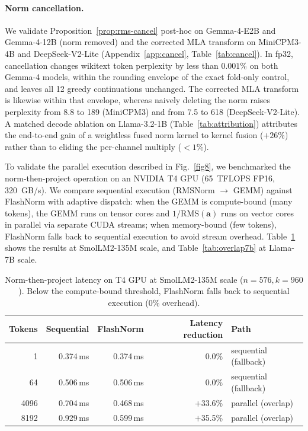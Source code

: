 \documentclass{article}
\begin{document}
\paragraph{Norm cancellation.} We validate Proposition~\ref{prop:rms-cancel} post-hoc on Gemma-4-E2B and Gemma-4-12B (norm removed) and the corrected MLA transform on MiniCPM3-4B and DeepSeek-V2-Lite (Appendix~\ref{app:cancel}, Table~\ref{tab:cancel}). In fp32, cancellation changes wikitext token perplexity by less than $0.001\%$ on both Gemma-4 models, within the rounding envelope of the exact fold-only control, and leaves all 12 greedy continuations unchanged. The corrected MLA transform is likewise within that envelope, whereas naively deleting the norm raises perplexity from 8.8 to 189 (MiniCPM3) and from 7.5 to 618 (DeepSeek-V2-Lite). A matched decode ablation on Llama-3.2-1B (Table~\ref{tab:attribution}) attributes the end-to-end gain of a weightless fused norm kernel to kernel fusion ($+26\%$) rather than to eliding the per-channel multiply ($<1\%$).

To validate the parallel execution described in Fig.~\ref{fig8}, we benchmarked the norm-then-project operation on an NVIDIA T4 GPU (65~TFLOPS FP16, 320~GB/s). We compare sequential execution (RMSNorm $\rightarrow$ GEMM) against FlashNorm with adaptive dispatch: when the GEMM is compute-bound (many tokens), the GEMM runs on tensor cores and $1/\mathrm{RMS}(\mathbf{a})$ runs on vector cores in parallel via separate CUDA streams; when memory-bound (few tokens), FlashNorm falls back to sequential execution to avoid stream overhead. Table~\ref{tab:overlap} shows the results at SmolLM2-135M scale, and Table~\ref{tab:overlap7b} at Llama-7B scale.

\begin{table}[h!] \centering
\caption{Norm-then-project latency on T4 GPU at SmolLM2-135M scale ($n{=}576, k{=}960$). Below the compute-bound threshold, FlashNorm falls back to sequential execution (0\% overhead).}
\label{tab:overlap}
\begin{tabular}{r r r r l}
\hline
Tokens & Sequential & FlashNorm & Latency reduction & Path \\
\hline
1      & 0.374\,ms & 0.374\,ms & $0.0$\% & sequential (fallback) \\
64     & 0.506\,ms & 0.506\,ms & $0.0$\% & sequential (fallback) \\
4096   & 0.704\,ms & 0.468\,ms & $+$33.6\% & parallel (overlap) \\
8192   & 0.929\,ms & 0.599\,ms & $+$35.5\% & parallel (overlap) \\
\hline
\end{tabular}
\end{table}
\end{document}
